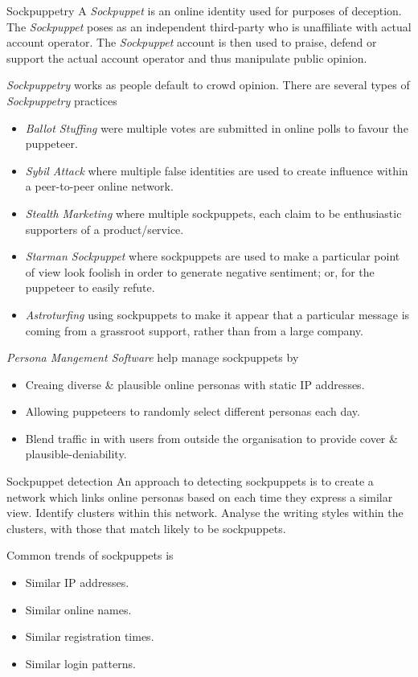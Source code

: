 \documentclass[11pt,a4paper]{article}
\begin{document}
  \begin{definition}{Sockpuppetry}
    A \textit{Sockpuppet} is an online identity used for purposes of deception. The \textit{Sockpuppet} poses as an independent third-party who is unaffiliate with actual account operator. The \textit{Sockpuppet} account is then used to praise, defend or support the actual account operator and thus manipulate public opinion.
    \par \textit{Sockpuppetry} works as people default to crowd opinion. There are several types of \textit{Sockpuppetry} practices
    \begin{itemize}
      \item \textit{Ballot Stuffing} were multiple votes are submitted in online polls to favour the puppeteer.
      \item \textit{Sybil Attack} where multiple false identities are used to create influence within a peer-to-peer online network.
      \item \textit{Stealth Marketing} where multiple sockpuppets, each claim to be enthusiastic supporters of a product/service.
      \item \textit{Starman Sockpuppet} where sockpuppets are used to make a particular point of view look foolish in order to generate negative sentiment; or, for the puppeteer to easily refute.
      \item \textit{Astroturfing} using sockpuppets to make it appear that a particular message is coming from a grassroot support, rather than from a large company.
    \end{itemize}
    \textit{Persona Mangement Software} help manage sockpuppets by
    \begin{itemize}
      \item Creaing diverse \& plausible online personas with static IP addresses.
      \item Allowing puppeteers to randomly select different personas each day.
      \item Blend traffic in with users from outside the organisation to provide cover \& plausible-deniability.
    \end{itemize}
  \end{definition}

  \begin{proposition}{Sockpuppet detection}
    An approach to detecting sockpuppets is to create a network which links online personas based on each time they express a similar view. Identify clusters within this network. Analyse the writing styles within the clusters, with those that match likely to be sockpuppets.
    \par Common trends of sockpuppets is
    \begin{itemize}
      \item Similar IP addresses.
      \item Similar online names.
      \item Similar registration times.
      \item Similar login patterns.
    \end{itemize}
  \end{proposition}
\end{document}
